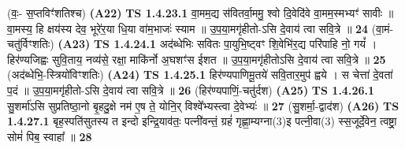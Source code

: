 \documentclass[17pt]{extarticle}
\begin{document}
                      (वः॒- स॒प्तविꣳ॑शतिश्च)  \textbf{(A22)} \newline \newline
                                        \textbf{ TS 1.4.23.1} \newline
                  वा॒मम॒द्य स॑वितर्वा॒ममु॒ श्वो दि॒वेदि॑वे वा॒मम॒स्मभ्यꣳ॑ सावीः ॥ वा॒मस्य॒ हि क्षय॑स्य देव॒ भूरे॑र॒या धि॒या वा॑म॒भाजः॑ स्याम ॥ उ॒प॒या॒मगृ॑हीतो-ऽसि दे॒वाय॑ त्वा सवि॒त्रे ॥ \textbf{  24} \newline
                  \newline
                      (वा॒मं-चतु॑र्विꣳशतिः)  \textbf{(A23)} \newline \newline
                                        \textbf{ TS 1.4.24.1} \newline
                  अद॑ब्धेभिः सवितः पा॒युभि॒ष्ट्वꣳ शि॒वेभि॑र॒द्य परि॑पाहि नो॒ गयं᳚ । हिर॑ण्यजिह्वः सुवि॒ताय॒ नव्य॑से॒ रक्षा॒ माकि॑र्नो अ॒घशꣳ॑स ईशत ॥ उ॒प॒या॒मगृ॑हीतोऽसि दे॒वाय॑ त्वा सवि॒त्रे ॥ \textbf{  25 } \newline
                  \newline
                      (अद॑ब्धेभि॒-स्त्रियो॑विꣳशतिः)  \textbf{(A24)} \newline \newline
                                        \textbf{ TS 1.4.25.1} \newline
                  हिर॑ण्यपाणिमू॒तये॑ सवि॒तार॒मुप॑ ह्वये । स चेत्ता॑ दे॒वता॑ प॒दं ॥ उ॒प॒या॒मगृ॑हीतो-ऽसि दे॒वाय॑ त्वा सवि॒त्रे ॥ \textbf{  26} \newline
                  \newline
                      (हिर॑ण्यपाणिं॒-चतु॑र्दश)  \textbf{(A25)} \newline \newline
                                        \textbf{ TS 1.4.26.1} \newline
                  सु॒शर्मा॑ऽसि सुप्रतिष्ठा॒नो बृ॒हदु॒क्षे नम॑ ए॒ष ते॒ योनि॒र् विश्वे᳚भ्यस्त्वा दे॒वेभ्यः॑ ॥ \textbf{  27} \newline
                  \newline
                      (सु॒शर्मा॒-द्वाद॑श)  \textbf{(A26)} \newline \newline
                                        \textbf{ TS 1.4.27.1} \newline
                  बृह॒स्पति॑सुतस्य त इन्दो इन्द्रि॒याव॑तः॒ पत्नी॑वन्तं॒ ग्रहं॑ गृह्णा॒म्यग्ना(3)इ पत्नी॒वा(3) स्स॒जूर्दे॒वेन॒ त्वष्ट्रा॒ सोमं॑ पिब॒ स्वाहा᳚ ॥ \textbf{  28} \newline
\end{document}
